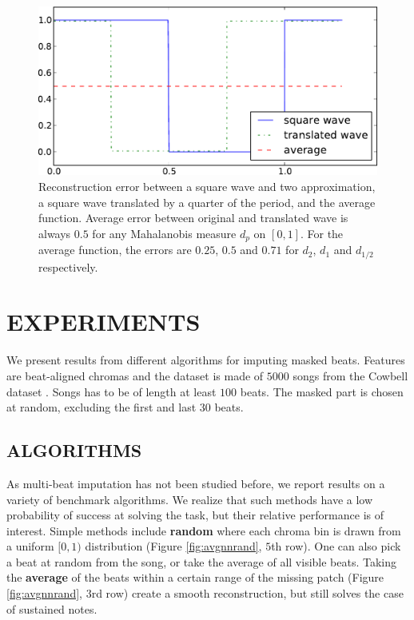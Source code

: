 \documentclass{article}
\begin{document}
\begin{figure}[t]
\begin{center}
\includegraphics[width=.8\columnwidth]{square}
\end{center}
\caption{Reconstruction error between a square wave and two approximation,
a square wave translated by a quarter of the period, and the average
function. Average error between original and translated wave is always $0.5$
for any Mahalanobis measure $d_p$ on $[0,1]$. 
For the average function, the errors are
$0.25$, $0.5$ and $0.71$ for $d_2$, $d_1$ and $d_{1/2}$ respectively.
\label{fig:square}}
\end{figure}

\section{EXPERIMENTS}
\label{sec:exp}
We present results from different algorithms for imputing masked
beats.  Features are beat-aligned chromas and the dataset is made of
$5000$ songs from the Cowbell dataset
\cite{Bertin-Mahieux2010a}. Songs has to be of length at least $100$
beats.  The masked part is chosen at random, excluding the first and
last $30$ beats.

\subsection{ALGORITHMS}
\label{ssec:algo}
As multi-beat imputation has not been studied before, we report
results on a variety of benchmark algorithms. We realize that such
methods have a low probability of success at solving the task, but
their relative performance is of interest.  Simple methods include
\textbf{random} where each chroma bin is drawn from a uniform $[0,1)$
distribution (Figure \ref{fig:avgnnrand}, $5$th row).  One can also
pick a beat at random from the song, or take the average of all
visible beats. Taking the \textbf{average} of the beats within a certain
range of the missing patch (Figure \ref{fig:avgnnrand}, $3$rd row)
create a smooth reconstruction, but still solves the case of
sustained notes.
\end{document}

